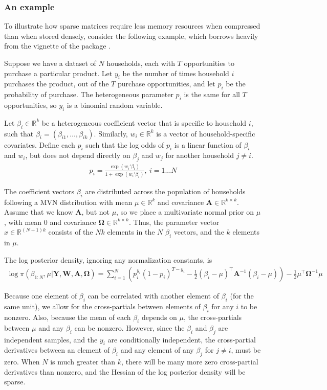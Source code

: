 \documentclass[codesnippet]{jss}\usepackage[]{graphicx}\usepackage[]{color}
\newcommand{\Real}[1]{\mathbb{R}^{#1}}
\newcommand{\Mat}[1]{\mathbf{#1}}
\begin{document}
\subsubsection{An example}

To illustrate how sparse matrices require less memory resources when
compressed than when stored densely, consider the following example,
which borrows heavily from the vignette of the
 package \citep{R_sparseHessianFD}.

Suppose we have a dataset of $N$ households, each with $T$
 opportunities to purchase a particular product.  Let $y_i$ be the
 number of times household $i$ purchases the product, out of the $T$
 purchase opportunities, and let $p_i$ be the probability of
 purchase.  The heterogeneous parameter $p_i$ is the same for all $T$
 opportunities, so $y_i$ is a binomial random variable.

 Let $\beta_i\in\Real{k}$ be a heterogeneous coefficient vector that
 is specific to household $i$, such that
 $\beta_i=(\beta_{i1},\dotsc,\beta_{ik})$. Similarly,
 $w_i\in\Real{k}$ is a vector of household-specific covariates. Define each
 $p_i$ such that the log odds of $p_i$ is a linear function of
 $\beta_i$ and $w_i$, but does not depend directly on $\beta_j$ and $w_j$ for
 another household $j\neq i$.
\begin{align}
  p_i=\frac{\exp(w_i'\beta_i)}{1+\exp(w_i'\beta_i)},~i=1 ... N
\end{align}

The coefficient vectors $\beta_i$ are distributed across the population of households
following a MVN distribution with mean $\mu\in\Real{k}$ and
covariance $\Mat{A}\in\Real{k\times k}$.   Assume that we know
$\Mat{A}$, but not $\mu$, so we place a multivariate normal prior
on $\mu$, with mean $0$ and
covariance $\Mat{\Omega}\in\Real{k\times k}$.  Thus, the parameter
vector $x\in\Real{(N+1)k}$ consists of the $Nk$ elements in the $N$ $\beta_i$ vectors,
and the $k$ elements in $\mu$.

The log posterior density, ignoring any normalization constants, is
\begin{align}
  \label{eq:LPD}
  \log \pi(\beta_{1:N},\mu|\Mat{Y}, \Mat{W}, \Mat{A},\Mat{\Omega})=\sum_{i=1}^N\left(p_i^{y_i}(1-p_i)^{T-y_i}
  -\frac{1}{2}\left(\beta_i-\mu\right)^\top\Mat{A}^{-1}\left(\beta_i-\mu\right)\right)
-\frac{1}{2}\mu^\top\Mat{\Omega}^{-1}\mu
\end{align}

Because one element of $\beta_i$ can be correlated with another
element of $\beta_i$ (for the same unit), we allow for the
cross-partials between elements of $\beta_i$ for any $i$ to be
nonzero.  Also, because the mean of each $\beta_i$ depends on $\mu$,
the cross-partials between $\mu$ and any $\beta_i$ can be nonzero.
However, since the $\beta_i$ and $\beta_j$ are independent samples,
and the $y_i$ are
conditionally independent, the cross-partial derivatives between an
element of $\beta_i$ and any element of any $\beta_j$ for $j\neq i$,
must be zero.  When $N$ is much greater than $k$, there will be many
more zero cross-partial derivatives than nonzero, and the Hessian of
the log posterior density will be sparse.
\end{document}
